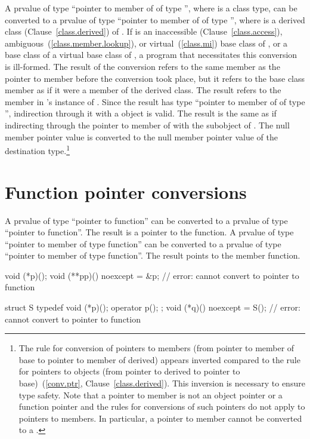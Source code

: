 \pnum
A prvalue of type ``pointer to member of  of type 
'', where  is a class type, can be converted to
a prvalue of type ``pointer to member of  of type 
'', where  is a derived class
(Clause~\ref{class.derived}) of . If  is an
inaccessible (Clause~\ref{class.access}),
ambiguous~(\ref{class.member.lookup}), or virtual~(\ref{class.mi}) base
class of , or a base class of a virtual base class of
, a program that necessitates this conversion is ill-formed.
The result of the conversion refers to the same member as the pointer to
member before the conversion took place, but it refers to the base class
member as if it were a member of the derived class. The result refers to
the member in 's instance of . Since the result has
type ``pointer to member of  of type  '',
indirection through it with a  object is valid. The result is the same
as if indirecting through the pointer to member of  with the
 subobject of . The null member pointer value is
converted to the null member pointer value of the destination
type.\footnote{The rule for conversion of pointers to members (from pointer to member
of base to pointer to member of derived) appears inverted compared to
the rule for pointers to objects (from pointer to derived to pointer to
base)~(\ref{conv.ptr}, Clause~\ref{class.derived}). This inversion is
necessary to ensure type safety. Note that a pointer to member is not
an object pointer or a function pointer
and the rules for conversions
of such pointers do not apply to pointers to members.
%
In particular, a pointer to member cannot be converted to a
.}

\section[conv.fctptr]{Function pointer conversions}

\pnum
{}%
A prvalue of type ``pointer to  function''
can be converted to a prvalue of type ``pointer to function''.
The result is a pointer to the function.
A prvalue of type ``pointer to member of type  function''
can be converted to a prvalue of type ``pointer to member of type function''.
The result points to the member function.

\begin{example}
\begin{codeblock}
  void (*p)();
  void (**pp)() noexcept = &p;  // error: cannot convert to pointer to  function

  struct S { typedef void (*p)(); operator p(); };
  void (*q)() noexcept = S();   // error: cannot convert to pointer to  function
\end{codeblock}
\end{example}

